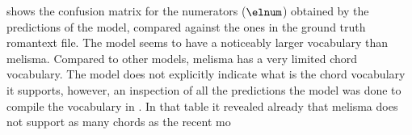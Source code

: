 
 shows the confusion
matrix for the numerators ($\elnum$) obtained by the
predictions of the \textcite{chen2021attend} model, compared
against the ones in the ground truth \gls{romantext} file.
The \textcite{chen2021attend} model seems to have a
noticeably larger vocabulary than \gls{melisma}. Compared to
other models, \gls{melisma} has a very limited chord
vocabulary. The model does not explicitly indicate what is
the chord vocabulary it supports, however, an inspection of
all the predictions the model was done to compile the
vocabulary in . In that table it
revealed already that \gls{melisma} does not support as many
chords as the recent mo


